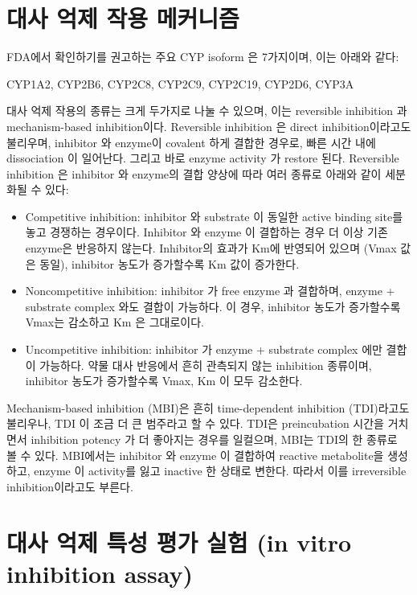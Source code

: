 \documentclass[
  11pt,
  krantz2, a4paper, twoside]{krantz}
\providecommand{\tightlist}{%
  \setlength{\itemsep}{0pt}\setlength{\parskip}{0pt}}
\begin{document}
\hypertarget{uxb300uxc0ac-uxc5b5uxc81c-uxc791uxc6a9-uxba54uxcee4uxb2c8uxc998}{%
\section{대사 억제 작용 메커니즘}\label{uxb300uxc0ac-uxc5b5uxc81c-uxc791uxc6a9-uxba54uxcee4uxb2c8uxc998}}

FDA에서 확인하기를 권고하는 주요 CYP isoform 은 7가지이며, 이는 아래와
같다:

CYP1A2, CYP2B6, CYP2C8, CYP2C9, CYP2C19, CYP2D6, CYP3A

대사 억제 작용의 종류는 크게 두가지로 나눌 수 있으며, 이는 reversible
inhibition 과 mechanism-based inhibition이다. Reversible inhibition 은
direct inhibition이라고도 불리우며, inhibitor 와 enzyme이 covalent 하게
결합한 경우로, 빠른 시간 내에 dissociation 이 일어난다. 그리고 바로
enzyme activity 가 restore 된다. Reversible inhibition 은 inhibitor 와
enzyme의 결합 양상에 따라 여러 종류로 아래와 같이 세분화될 수 있다:

\begin{itemize}
\tightlist
\item
  Competitive inhibition: inhibitor 와 substrate 이 동일한 active
  binding site를 놓고 경쟁하는 경우이다. Inhibitor 와 enzyme 이
  결합하는 경우 더 이상 기존 enzyme은 반응하지 않는다. Inhibitor의
  효과가 Km에 반영되어 있으며 (Vmax 값은 동일), inhibitor 농도가
  증가할수록 Km 값이 증가한다.
\item
  Noncompetitive inhibition: inhibitor 가 free enzyme 과 결합하며,
  enzyme + substrate complex 와도 결합이 가능하다. 이 경우, inhibitor
  농도가 증가할수록 Vmax는 감소하고 Km 은 그대로이다.
\item
  Uncompetitive inhibition: inhibitor 가 enzyme + substrate complex
  에만 결합이 가능하다. 약물 대사 반응에서 흔히 관측되지 않는
  inhibition 종류이며, inhibitor 농도가 증가할수록 Vmax, Km 이 모두
  감소한다.
\end{itemize}

Mechanism-based inhibition (MBI)은 흔히 time-dependent inhibition
(TDI)라고도 불리우나, TDI 이 조금 더 큰 범주라고 할 수 있다. TDI은
preincubation 시간을 거치면서 inhibition potency 가 더 좋아지는 경우를
일컬으며, MBI는 TDI의 한 종류로 볼 수 있다. MBI에서는 inhibitor 와
enzyme 이 결합하여 reactive metabolite을 생성하고, enzyme 이 activity를
잃고 inactive 한 상태로 변한다. 따라서 이를 irreversible
inhibition이라고도 부른다.

\hypertarget{uxb300uxc0ac-uxc5b5uxc81c-uxd2b9uxc131-uxd3c9uxac00-uxc2e4uxd5d8-in-vitro-inhibition-assay}{%
\section{대사 억제 특성 평가 실험 (in vitro inhibition assay)}\label{uxb300uxc0ac-uxc5b5uxc81c-uxd2b9uxc131-uxd3c9uxac00-uxc2e4uxd5d8-in-vitro-inhibition-assay}}
\end{document}
